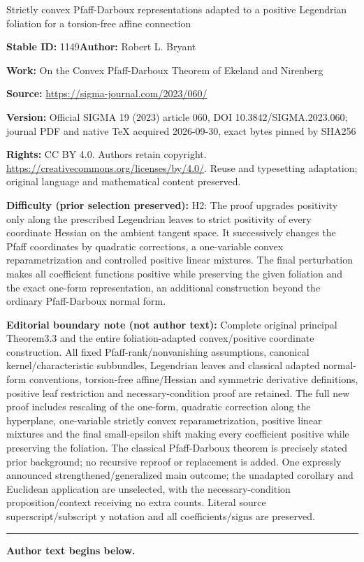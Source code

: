 \documentclass[11pt]{article}
\numberwithin{equation}{section}
\numberwithin{equation}{section}
\begin{document}
\begin{center}\Large Strictly convex Pfaff-Darboux representations adapted to a positive Legendrian foliation for a torsion-free affine connection\end{center}
\noindent\textbf{Stable ID:} 1149\quad\textbf{Author:} Robert L. Bryant\par
\noindent\textbf{Work:} On the Convex Pfaff-Darboux Theorem of Ekeland and Nirenberg\par
\noindent\textbf{Source:} \url{https://sigma-journal.com/2023/060/}\par
\noindent\textbf{Version:} Official SIGMA 19 (2023) article 060, DOI 10.3842/SIGMA.2023.060; journal PDF and native TeX acquired 2026-09-30, exact bytes pinned by SHA256\par
\noindent\textbf{Rights:} CC BY 4.0. Authors retain copyright. \url{https://creativecommons.org/licenses/by/4.0/}. Reuse and typesetting adaptation; original language and mathematical content preserved.\par
\noindent\textbf{Difficulty (prior selection preserved):} {\CJKfont H2: The proof upgrades positivity only along the prescribed Legendrian leaves to strict positivity of every coordinate Hessian on the ambient tangent space. It successively changes the Pfaff coordinates by quadratic corrections, a one-variable convex reparametrization and controlled positive linear mixtures. The final perturbation makes all coefficient functions positive while preserving the given foliation and the exact one-form representation, an additional construction beyond the ordinary Pfaff-Darboux normal form.}\par
\medskip\noindent\textbf{Editorial boundary note (not author text):} Complete original principal Theorem3.3 and the entire foliation-adapted convex/positive coordinate construction. All fixed Pfaff-rank/nonvanishing assumptions, canonical kernel/characteristic subbundles, Legendrian leaves and classical adapted normal-form conventions, torsion-free affine/Hessian and symmetric derivative definitions, positive leaf restriction and necessary-condition proof are retained. The full new proof includes rescaling of the one-form, quadratic correction along the hyperplane, one-variable strictly convex reparametrization, positive linear mixtures and the final small-epsilon shift making every coefficient positive while preserving the foliation. The classical Pfaff-Darboux theorem is precisely stated prior background; no recursive reproof or replacement is added. One expressly announced strengthened/generalized main outcome; the unadapted corollary and Euclidean application are unselected, with the necessary-condition proposition/context receiving no extra counts. Literal source superscript/subscript y notation and all coefficients/signs are preserved.\par
\medskip\hrule\medskip\noindent\textbf{Author text begins below.}\par
\setcounter{section}{1}
\end{document}

